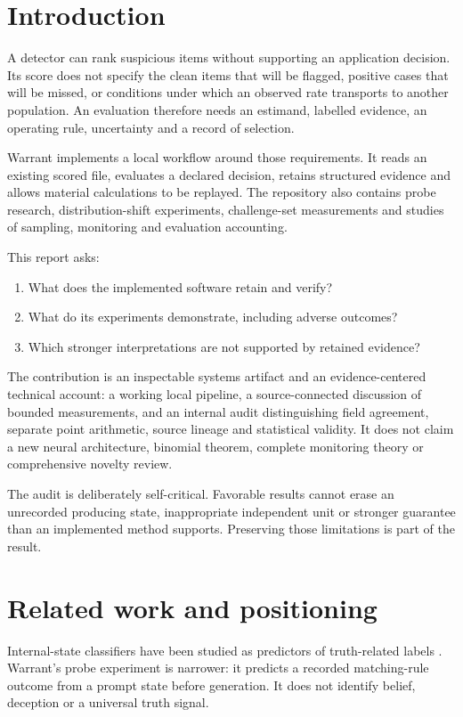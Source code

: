 \section{Introduction}
A detector can rank suspicious items without supporting an application decision.
Its score does not specify the clean items that will be flagged, positive cases
that will be missed, or conditions under which an observed rate transports to
another population. An evaluation therefore needs an estimand, labelled
evidence, an operating rule, uncertainty and a record of selection.

Warrant implements a local workflow around those requirements. It reads an
existing scored file, evaluates a declared decision, retains structured evidence
and allows material calculations to be replayed. The repository also contains
probe research, distribution-shift experiments, challenge-set measurements and
studies of sampling, monitoring and evaluation accounting.

This report asks:
\begin{enumerate}
\item What does the implemented software retain and verify?
\item What do its experiments demonstrate, including adverse outcomes?
\item Which stronger interpretations are not supported by retained evidence?
\end{enumerate}

The contribution is an inspectable systems artifact and an evidence-centered
technical account: a working local pipeline, a source-connected discussion of
bounded measurements, and an internal audit distinguishing field agreement,
separate point arithmetic, source lineage and statistical validity. It does not
claim a new neural architecture, binomial theorem, complete monitoring theory
or comprehensive novelty review.

The audit is deliberately self-critical. Favorable results cannot erase an
unrecorded producing state, inappropriate independent unit or stronger guarantee
than an implemented method supports. Preserving those limitations is part of
the result.

\section{Related work and positioning}
Internal-state classifiers have been studied as predictors of truth-related
labels \citep{azaria2023}. Warrant's probe experiment is narrower: it predicts a
recorded matching-rule outcome from a prompt state before generation. It does
not identify belief, deception or a universal truth signal.

